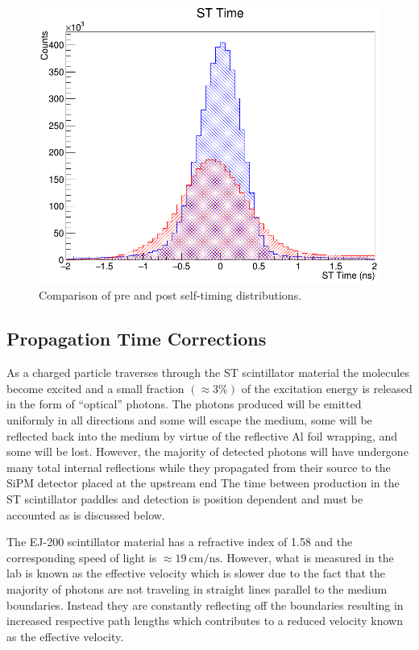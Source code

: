 {\begin{figure}[!htb]
		\includegraphics[width=1.0\columnwidth]{calibration/figs/st_time_overlay_ch15}
		\caption{Comparison of pre and post self-timing distributions.}
		\label{fig:sttimeoverlaych15}
	\end{figure}

\subsection{Propagation Time Corrections} \label{sec:calib_ptc}

As a charged particle traverses through the ST scintillator material the molecules become excited and a small fraction $(\approx 3\%)$ \cite{pdg_2012} of the excitation energy is released in the form of ``optical'' photons.  The photons produced will be emitted uniformly in all directions and some will escape the medium, some will be reflected back into the medium by virtue of the reflective Al foil wrapping, and some will be lost.  However, the majority of detected  photons will have undergone many total internal reflections while they propagated from their source to the SiPM detector placed at the upstream end  The time between production in the ST scintillator paddles and detection is position dependent and must be accounted as is discussed below.

The EJ-200 scintillator material has a refractive index of 1.58 \cite{ej200_specs} and the corresponding speed of light is $\approx \mathrm{19\ cm/ns}$.  However, what is measured in the lab is known as the effective velocity which is slower due to the fact that the majority of photons are not traveling in straight lines parallel to the medium boundaries.  Instead they are constantly reflecting off the boundaries resulting in increased respective path lengths which contributes to a reduced velocity known as the effective velocity.  

}

